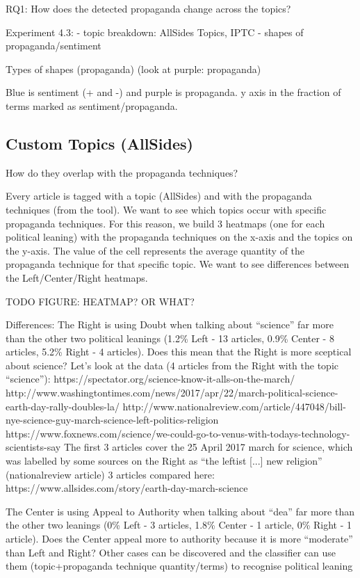 RQ1: How does the detected propaganda change across the topics?

Experiment 4.3: 
- topic breakdown: AllSides Topics, IPTC
- shapes of propaganda/sentiment 


Types of shapes (propaganda)
(look at purple: propaganda)

Blue is sentiment (+ and -) and purple is propaganda. 
y axis in the fraction of terms marked as sentiment/propaganda.

\subsection{Custom Topics (AllSides)}

How do they overlap with the propaganda techniques?

Every article is tagged with a topic (AllSides) and with the propaganda techniques (from the tool).
We want to see which topics occur with specific propaganda techniques.
For this reason, we build 3 heatmaps (one for each political leaning) with the propaganda techniques on the x-axis and the topics on the y-axis. The value of the cell represents the average quantity of the propaganda technique for that specific topic.
We want to see differences between the Left/Center/Right heatmaps.

TODO FIGURE: HEATMAP? OR WHAT?

Differences:
The Right is using Doubt when talking about “science” far more than the other two political leanings (1.2\% Left - 13 articles, 0.9\% Center - 8 articles, 5.2\% Right - 4 articles). Does this mean that the Right is more sceptical about science? Let’s look at the data (4 articles from the Right with the topic “science”):
https://spectator.org/science-know-it-alls-on-the-march/
http://www.washingtontimes.com/news/2017/apr/22/march-political-science-earth-day-rally-doubles-la/ 
http://www.nationalreview.com/article/447048/bill-nye-science-guy-march-science-left-politics-religion
https://www.foxnews.com/science/we-could-go-to-venus-with-todays-technology-scientists-say 
The first 3 articles cover the 25 April 2017 march for science, which was labelled by some sources on the Right as “the leftist [...] new religion” (nationalreview article)
3 articles compared here: https://www.allsides.com/story/earth-day-march-science 

The Center is using Appeal to Authority when talking about “dea” far more than the other two leanings (0\% Left - 3 articles, 1.8\% Center - 1 article, 0\% Right - 1 article). Does the Center appeal more to authority because it is more “moderate” than Left and Right?
Other cases can be discovered and the classifier can use them (topic+propaganda technique quantity/terms) to recognise political leaning



